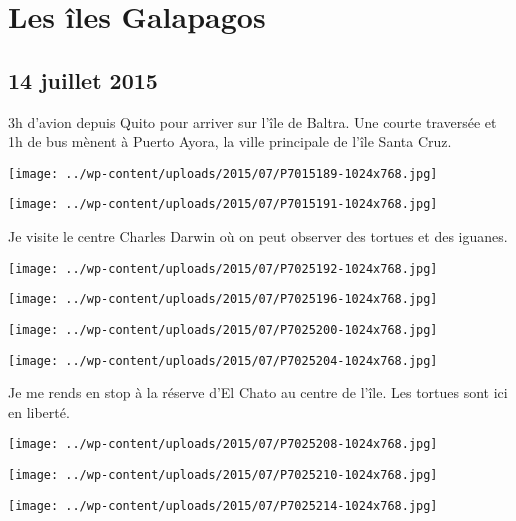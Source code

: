 \chapter{Les îles Galapagos}
\section*{14 juillet 2015}
3h d'avion depuis Quito pour arriver sur l'île de Baltra. Une courte traversée et 1h de bus mènent à Puerto Ayora, la ville principale de l'île Santa Cruz. \newline
 \newline
\centerline{\texttt{[image: ../wp-content/uploads/2015/07/P7015189-1024x768.jpg]} } 
 \newline
 \newline
\centerline{\texttt{[image: ../wp-content/uploads/2015/07/P7015191-1024x768.jpg]} } 
 \newline
 Je visite le centre Charles Darwin où on peut observer des tortues et des iguanes. \newline
 \newline
\centerline{\texttt{[image: ../wp-content/uploads/2015/07/P7025192-1024x768.jpg]} } 
 \newline
 \newline
\centerline{\texttt{[image: ../wp-content/uploads/2015/07/P7025196-1024x768.jpg]} } 
 \newline
 \newline
\centerline{\texttt{[image: ../wp-content/uploads/2015/07/P7025200-1024x768.jpg]} } 
 \newline
 \newline
\centerline{\texttt{[image: ../wp-content/uploads/2015/07/P7025204-1024x768.jpg]} } 
 \newline
 Je me rends en stop à la réserve d'El Chato au centre de l'île. Les tortues sont ici en liberté. \newline
 \newline
\centerline{\texttt{[image: ../wp-content/uploads/2015/07/P7025208-1024x768.jpg]} } 
 \newline
 \newline
\centerline{\texttt{[image: ../wp-content/uploads/2015/07/P7025210-1024x768.jpg]} } 
 \newline
 \newline
\centerline{\texttt{[image: ../wp-content/uploads/2015/07/P7025214-1024x768.jpg]} } 
